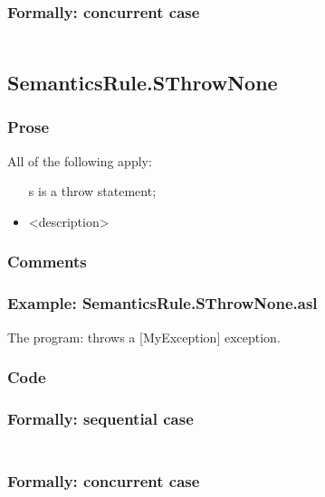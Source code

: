 \documentclass{book}
\begin{document}
  \subsubsection{Formally: concurrent case}
  \begin{align}
  \end{align} 

\subsection{SemanticsRule.SThrowNone \label{sec:SemanticsRule.SThrowNone}}

    \subsubsection{Prose}
    All of the following apply:
    \begin{itemize}
    \item [s] is a throw statement;
    \item <description>
    \end{itemize}

    \subsubsection{Comments}

    \subsubsection{Example: SemanticsRule.SThrowNone.asl}
    The program:
    throws a [MyException] exception.

  \subsubsection{Code}

  \subsubsection{Formally: sequential case}
  \begin{align}
  \end{align} 

  \subsubsection{Formally: concurrent case}
  \begin{align}
  \end{align} 
\end{document}
